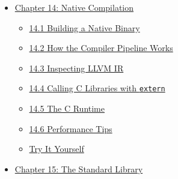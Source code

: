 \documentclass[
  english,
]{book}
\providecommand{\tightlist}{%
  \setlength{\itemsep}{0pt}\setlength{\parskip}{0pt}}
\begin{document}
\begin{itemize}
  \begin{itemize}
  \tightlist
  \item
    \hyperref[131-tensor-types]{13.1 Tensor Types}
  \item
    \hyperref[132-the-einsum-intrinsic]{13.2 The \texttt{einsum}
    Intrinsic}
  \item
    \hyperref[133-building-a-neural-network-layer]{13.3 Building a
    Neural Network Layer}
  \item
    \hyperref[134-activation-functions]{13.4 Activation Functions}
  \item
    \hyperref[135-a-simple-training-loop]{13.5 A Simple Training Loop}
  \item
    \hyperref[136-sparse-tensors]{13.6 Sparse Tensors}
  \item
    \hyperref[139-model-dsl-neural-network-architectures]{13.9 Model DSL
    (Neural Network Architectures)}
  \item
    \hyperref[1310-machine-learning-stdlib-modules-stdml-stdrl-stdnn]{13.10
    Machine Learning Stdlib Modules (\texttt{std.ml}, \texttt{std.rl},
    \texttt{std.nn})}
  \item
    \hyperref[try-it-yourself]{Try It Yourself}
  \item
    \hyperref[137-native-neural-networks-stdnn]{13.7 Native Neural
    Networks (\texttt{std.nn})}
  \item
    \hyperref[138-external-model-inference-onnx]{13.8 External Model
    Inference (ONNX)}
  \end{itemize}
\item
  \hyperref[chapter-14-native-compilation]{Chapter 14: Native
  Compilation}

  \begin{itemize}
  \tightlist
  \item
    \hyperref[141-building-a-native-binary]{14.1 Building a Native
    Binary}
  \item
    \hyperref[142-how-the-compiler-pipeline-works]{14.2 How the Compiler
    Pipeline Works}
  \item
    \hyperref[143-inspecting-llvm-ir]{14.3 Inspecting LLVM IR}
  \item
    \hyperref[144-calling-c-libraries-with-extern]{14.4 Calling C
    Libraries with \texttt{extern}}
  \item
    \hyperref[145-the-c-runtime]{14.5 The C Runtime}
  \item
    \hyperref[146-performance-tips]{14.6 Performance Tips}
  \item
    \hyperref[try-it-yourself]{Try It Yourself}
  \end{itemize}
\item
  \hyperref[chapter-15-the-standard-library]{Chapter 15: The Standard
  Library}


\end{itemize}
\end{document}
